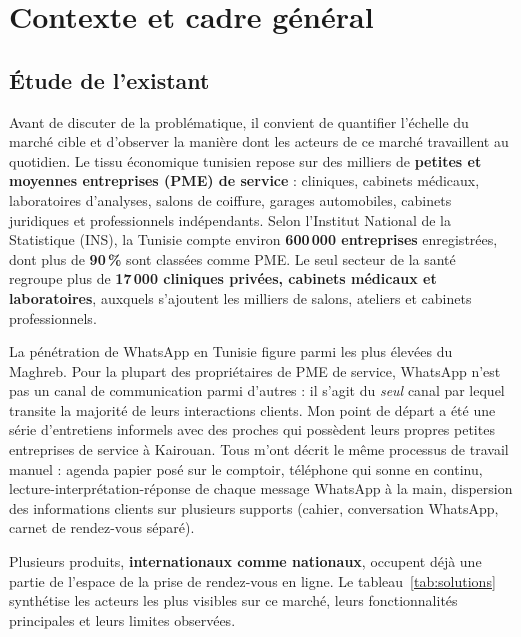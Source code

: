 \section{Contexte et cadre général}

\subsection{Étude de l'existant}
Avant de discuter de la problématique, il convient de quantifier
l'échelle du marché cible et d'observer la manière dont les acteurs
de ce marché travaillent au quotidien. Le tissu économique tunisien
repose sur des milliers de \textbf{petites et moyennes entreprises
(PME) de service} : cliniques, cabinets médicaux, laboratoires
d'analyses, salons de coiffure, garages automobiles, cabinets
juridiques et professionnels indépendants. Selon l'Institut National
de la Statistique (INS), la Tunisie compte environ
\textbf{600\,000 entreprises} enregistrées, dont plus de
\textbf{90\,\%} sont classées comme PME. Le seul secteur de la santé
regroupe plus de \textbf{17\,000 cliniques privées, cabinets médicaux
et laboratoires}, auxquels s'ajoutent les milliers de salons,
ateliers et cabinets professionnels.

La pénétration de WhatsApp en Tunisie figure parmi les plus élevées
du Maghreb. Pour la plupart des propriétaires de PME de service,
WhatsApp n'est pas un canal de communication parmi d'autres : il
s'agit du \emph{seul} canal par lequel transite la majorité de leurs
interactions clients. Mon point de départ a été une série
d'entretiens informels avec des proches qui possèdent leurs propres
petites entreprises de service à Kairouan. Tous m'ont décrit le même
processus de travail manuel : agenda papier posé sur le comptoir,
téléphone qui sonne en continu, lecture-interprétation-réponse de
chaque message WhatsApp à la main, dispersion des informations
clients sur plusieurs supports (cahier, conversation WhatsApp,
carnet de rendez-vous séparé).

Plusieurs produits, \textbf{internationaux comme nationaux}, occupent
déjà une partie de l'espace de la prise de rendez-vous en ligne.
Le tableau~\ref{tab:solutions} synthétise les acteurs les plus
visibles sur ce marché, leurs fonctionnalités principales et leurs
limites observées.

